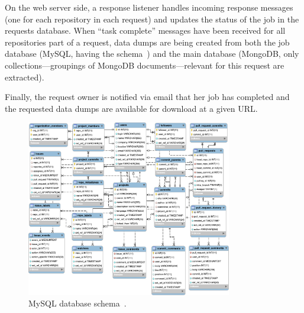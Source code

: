 On the web server side, a response listener handles incoming response messages (one for each repository
in each request)  and updates the status of the job in the requests database.
When ``task complete'' messages have been received for all repositories part of a request, data dumps
are being created from both the job database (MySQL, having the \ght schema~\cite{gousios2013ghtorent})
and the main \ght database (MongoDB, only collections---groupings of MongoDB documents---relevant for this
request are extracted).

Finally, the request owner is notified via email that her job has completed and the requested data dumps
are available for download at a given URL.

\begin{figure}[t]
\begin{center}
\includegraphics[width=0.80\textwidth]{figures/schema.pdf}
\caption{MySQL database schema~\cite{gousios2013ghtorent}.}
\label{fig:schema}
\end{center}
\end{figure}

